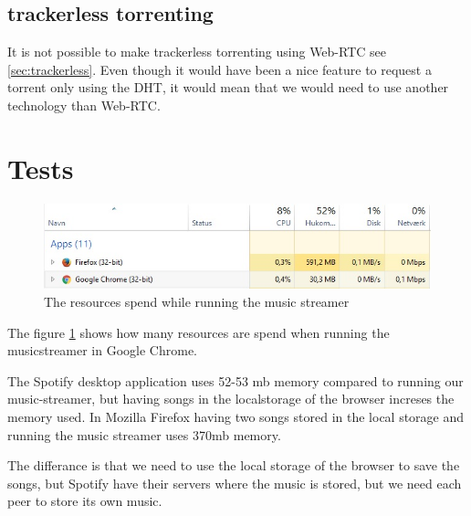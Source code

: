 \subsection{trackerless torrenting}
It is not possible to make trackerless torrenting using Web-RTC see \ref{sec:trackerless}. Even though it would have been a nice feature to request a torrent only using the \acs{DHT}, it would mean that we would need to use another technology than Web-RTC. 

\section{Tests}
\begin{figure}[H]
	\centering
	\includegraphics[scale=0.4]{gfx/streamerIdle}
	\caption{The resources spend while running the music streamer}
	\label{fig:streamer-idle}
\end{figure}
The figure \ref{fig:streamer-idle} shows how many resources are spend when running the musicstreamer in Google Chrome.

The Spotify desktop application uses 52-53 mb memory compared to running our music-streamer, but having songs in the localstorage of the browser increses the memory used. In Mozilla Firefox having two songs stored in the local storage and running the music streamer uses 370mb memory.

The differance is that we need to use the local storage of the browser to save the songs, but Spotify have their servers where the music is stored, but we need each peer to store its own music.

